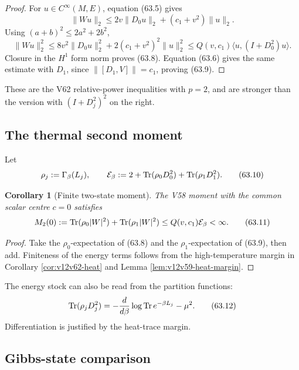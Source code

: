 \documentclass[11pt]{article}
\newtheorem{corollary}[theorem]{Corollary}
\theoremstyle{remark}
\begin{document}
\begin{proof}
For \(u\in C^\infty(M,E)\), equation (63.5) gives
\[
 \|Wu\|_2
 \leq
 2v\|D_0u\|_2+(c_1+v^2)\|u\|_2.
\]
Using \((a+b)^2\leq2a^2+2b^2\),
\[
 \|Wu\|_2^2
 \leq
 8v^2\|D_0u\|_2^2
 +
 2(c_1+v^2)^2\|u\|_2^2
 \leq
 Q(v,c_1)\langle u,(I+D_0^2)u\rangle.
\]
Closure in the \(H^1\) form norm proves (63.8).  Equation (63.6)
gives the same estimate with \(D_1\), since
\(\|[D_1,V]\|=c_1\), proving (63.9).
\end{proof}

These are the V62 relative-power inequalities with \(p=2\), and are
stronger than the version with \((I+D_j^2)^2\) on the right.

\subsection{The thermal second moment}

Let
\[
 \rho_j:=\Gamma_\beta(L_j),\qquad
 {\cal E}_\beta
 :=
 2+\operatorname{Tr}(\rho_0D_0^2)
   +\operatorname{Tr}(\rho_1D_1^2).               \tag{63.10}
\]

\begin{corollary}[Finite two-state moment]
\label{cor:v12v63-moment}
The V58 moment with the common scalar centre \(c=0\) satisfies
\begin{equation}
 M_2(0)
 :=
 \operatorname{Tr}(\rho_0|W|^2)
 +
 \operatorname{Tr}(\rho_1|W|^2)
 \leq
 Q(v,c_1){\cal E}_\beta<\infty.                   \tag{63.11}
\end{equation}
\end{corollary}

\begin{proof}
Take the \(\rho_0\)-expectation of (63.8) and the
\(\rho_1\)-expectation of (63.9), then add.  Finiteness of the energy
terms follows from the high-temperature margin in Corollary
\ref{cor:v12v62-heat} and Lemma
\ref{lem:v12v59-heat-margin}.
\end{proof}

The energy stock can also be read from the partition functions:
\begin{equation}
 \operatorname{Tr}(\rho_jD_j^2)
 =
 -{d\over d\beta}\log
   \operatorname{Tr}e^{-\beta L_j}
 -\mu^2.                                          \tag{63.12}
\end{equation}
Differentiation is justified by the heat-trace margin.

\subsection{Gibbs-state comparison}
\end{document}
